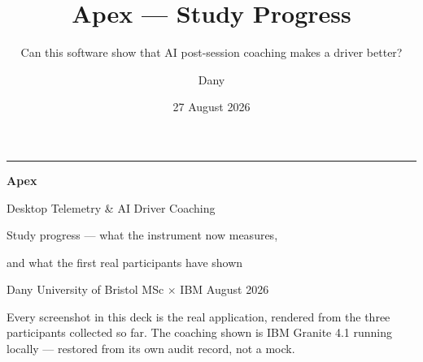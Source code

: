 \documentclass[aspectratio=169,10pt]{beamer}
\title{Apex --- Study Progress}
\subtitle{Can this software show that AI post-session coaching makes a driver better?}
\author{Dany}
\institute{University of Bristol MSc $\times$ IBM --- F1 Telemetry \& Driver Coaching}
\date{27 August 2026}
\begin{document}
\begin{frame}[plain]
  \vspace{1.2em}
  {\color{cblue}\rule{\textwidth}{3pt}}\par\vspace{1.0em}
  {\Huge\bfseries Apex}\par\vspace{0.35em}
  {\large Desktop Telemetry \& AI Driver Coaching}\par\vspace{0.9em}
  {\color{cgray}\large Study progress --- what the instrument now measures,\par
   and what the first real participants have shown}\par
  \vspace{1.6em}
  {\color{cgray}\footnotesize Dany \quad\textbullet\quad University of Bristol MSc $\times$ IBM
   \quad\textbullet{} August 2026}\par\vspace{0.6em}
  {\color{cgray}\scriptsize Every screenshot in this deck is the real application,
   rendered from the three participants collected so far. The coaching shown is
   IBM Granite 4.1 running locally --- restored from its own audit record, not a mock.}
\end{frame}
\end{document}
